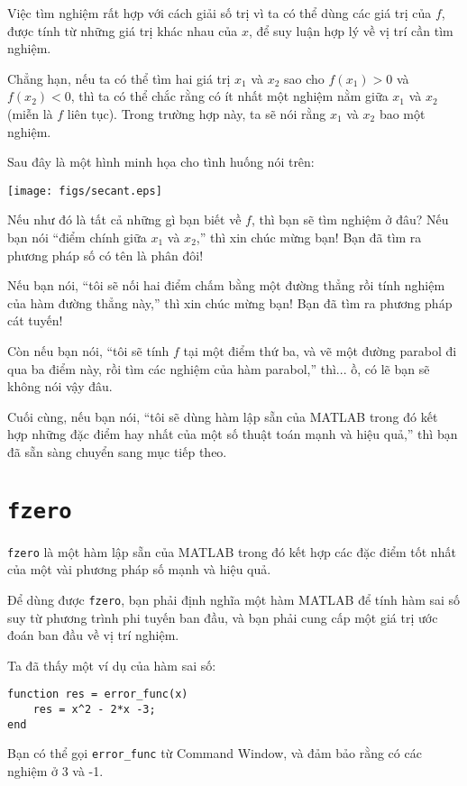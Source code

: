 \documentclass[12pt]{book}
\begin{document}
Việc tìm nghiệm rất hợp với cách giải số trị vì ta có thể dùng
các giá trị của $f$, được tính từ những giá trị khác nhau của $x$, 
để suy luận hợp lý về vị trí cần tìm nghiệm.

Chẳng hạn, nếu ta có thể tìm hai giá trị $x_1$ và $x_2$ sao cho
$f(x_1) > 0$ và $f(x_2) < 0$, thì ta có thể chắc rằng có ít nhất một
nghiệm nằm giữa $x_1$ và $x_2$ (miễn là $f$ liên tục). Trong trường
hợp này, ta sẽ nói rằng $x_1$ và $x_2$ bao một nghiệm.

Sau đây là một hình minh họa cho tình huống nói trên:

\beforefig 
\centerline{\texttt{[image: figs/secant.eps]}}

Nếu như đó là tất cả những gì bạn biết về $f$, thì bạn sẽ tìm
nghiệm ở đâu? Nếu bạn nói ``điểm chính giữa $x_1$ và $x_2$,''
thì xin chúc mừng bạn! Bạn đã tìm ra phương pháp số có tên là
phân đôi!

Nếu bạn nói, ``tôi sẽ nối hai điểm chấm bằng một đường thẳng rồi
tính nghiệm của hàm đường thẳng này,'' thì xin chúc mừng bạn! Bạn đã
tìm ra phương pháp cát tuyến!

Còn nếu bạn nói, ``tôi sẽ tính $f$ tại một điểm thứ ba, và vẽ một
đường parabol đi qua ba điểm này, rồi tìm các nghiệm của hàm
parabol,'' thì... ồ, có lẽ bạn sẽ không nói vậy đâu.

Cuối cùng, nếu bạn nói, ``tôi sẽ dùng hàm lập sẵn của MATLAB trong đó
kết hợp những đặc điểm hay nhất của một số thuật toán mạnh và
hiệu quả,'' thì bạn đã sẵn sàng chuyển sang mục tiếp theo.


\section{{\tt fzero}}
\label{fzero}

{\tt fzero} là một hàm lập sẵn của MATLAB trong đó kết hợp các
đặc điểm tốt nhất của một vài phương pháp số mạnh và hiệu quả.

Để dùng được {\tt fzero}, bạn phải định nghĩa một hàm MATLAB 
để tính hàm sai số suy từ phương trình phi tuyến ban đầu, và bạn
phải cung cấp một giá trị ước đoán ban đầu về vị trí nghiệm.

Ta đã thấy một ví dụ của hàm sai số:

\begin{verbatim}
function res = error_func(x)
    res = x^2 - 2*x -3;
end
\end{verbatim}

Bạn có thể gọi \verb#error_func# từ Command Window, và
đảm bảo rằng có các nghiệm ở  3 và -1.
\end{document}
